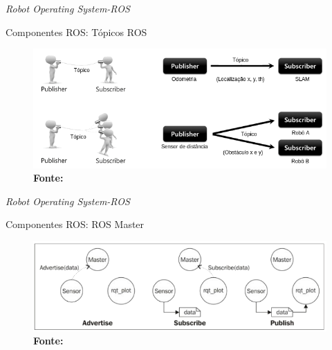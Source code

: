 \documentclass[10pt]{beamer}
\begin{document}
\begin{frame}{\textit{Robot Operating System-ROS}}
	\begin{alertblock}{Componentes ROS: Tópicos ROS}
		\vspace{0.7cm}
		\begin{figure}[h]
			\begin{center}
				\includegraphics[scale=0.41]{imagens/rostopic.png}\\
				{\footnotesize \textbf{Fonte:}}
			\end{center}
			\label{fig:topico}
		\end{figure}
	\end{alertblock}
\end{frame}

\begin{frame}{\textit{Robot Operating System-ROS}}
	\begin{alertblock}{Componentes ROS: ROS Master}
		\vspace{0.7cm}
		\begin{figure}[h]
			\begin{center}
				\includegraphics[scale=0.43]{imagens/rosmaster.png}\\
				{\footnotesize \textbf{Fonte:}}
			\end{center}
			\label{fig:master}
		\end{figure}
	\end{alertblock}
\end{frame}
\end{document}
